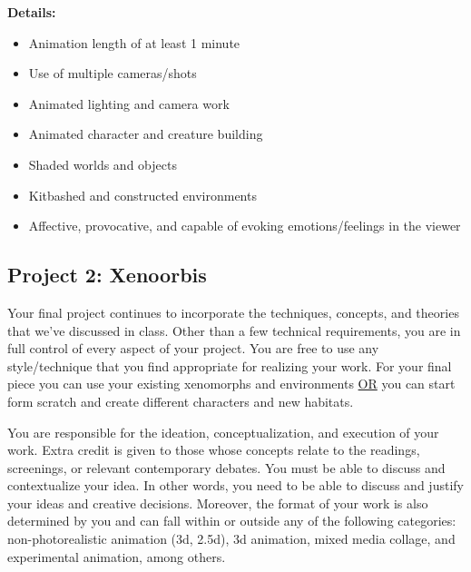\textbf{Details:}
\begin{itemize}
	\tightlist
	\item Animation length of at least 1 minute
	\item Use of multiple cameras/shots
	\item Animated lighting and camera work
	\item Animated character and creature building
	\item Shaded worlds and objects
	\item Kitbashed and constructed environments
	\item Affective, provocative, and capable of evoking emotions/feelings in the viewer
\end{itemize}

\hypertarget{project3}{\subsection{Project 2: Xenoorbis}}

Your final project continues to incorporate the techniques, concepts, and theories that we've discussed in class. Other than a few technical requirements, you are in full control of every aspect of your project. You are free to use any style/technique that you find appropriate for realizing your work. For your final piece you can use your existing xenomorphs and environments \ul{OR} you can start form scratch and create different characters and new habitats.

You are responsible for the ideation, conceptualization, and execution of your work. Extra credit is given to those whose concepts relate to the readings, screenings, or relevant contemporary debates. You must be able to discuss and contextualize your idea. In other words, you need to be able to discuss and justify your ideas and creative decisions. Moreover, the format of your work is also determined by you and can fall within or outside any of the following categories: non-photorealistic animation (3d, 2.5d), 3d animation, mixed media collage, and experimental animation, among others.

